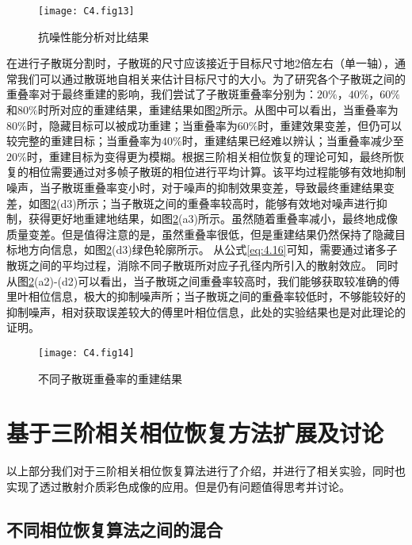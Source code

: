 \begin{figure}[htp]
	\centering
	\texttt{[image: C4.fig13]}
	\caption{抗噪性能分析对比结果}
	\label{fig:4.13}
\end{figure}

在进行子散斑分割时，子散斑的尺寸应该接近于目标尺寸地2倍左右（单一轴），通常我们可以通过散斑地自相关来估计目标尺寸的大小。为了研究各个子散斑之间的重叠率对于最终重建的影响，我们尝试了子散斑重叠率分别为：$20\%$，$40\%$，$60\%$和$80\%$时所对应的重建结果，重建结果如图\ref{fig:4.14}所示。从图中可以看出，当重叠率为$80\%$时，隐藏目标可以被成功重建；当重叠率为$60\%$时，重建效果变差，但仍可以较完整的重建目标；当重叠率为$40\%$时，重建结果已经难以辨认；当重叠率减少至$20\%$时，重建目标为变得更为模糊。根据三阶相关相位恢复的理论可知，最终所恢复的相位需要通过对多帧子散斑的相位进行平均计算。该平均过程能够有效地抑制噪声，当子散斑重叠率变小时，对于噪声的抑制效果变差，导致最终重建结果变差，如图\ref{fig:4.14}(d3)所示；当子散斑之间的重叠率较高时，能够有效地对噪声进行抑制，获得更好地重建地结果，如图\ref{fig:4.14}(a3)所示。虽然随着重叠率减小，最终地成像质量变差。但是值得注意的是，虽然重叠率很低，但是重建结果仍然保持了隐藏目标地方向信息，如图\ref{fig:4.14}(d3)绿色轮廓所示。
从公式\ref{eq:4.16}可知，需要通过诸多子散斑之间的平均过程，消除不同子散斑所对应子孔径内所引入的散射效应。
同时从图\ref{fig:4.14}(a2)-(d2)可以看出，当子散斑之间重叠率较高时，我们能够获取较准确的傅里叶相位信息，极大的抑制噪声所；当子散斑之间的重叠率较低时，不够能较好的抑制噪声，相对获取误差较大的傅里叶相位信息，此处的实验结果也是对此理论的证明。

\begin{figure}[htp]
	\centering
	\texttt{[image: C4.fig14]}
	\caption{不同子散斑重叠率的重建结果}
	\label{fig:4.14}
\end{figure}

\section{基于三阶相关相位恢复方法扩展及讨论}

以上部分我们对于三阶相关相位恢复算法进行了介绍，并进行了相关实验，同时也实现了透过散射介质彩色成像的应用。但是仍有问题值得思考并讨论。

\subsection{不同相位恢复算法之间的混合}

